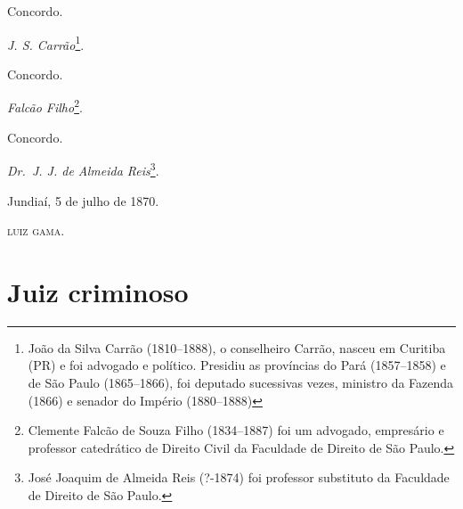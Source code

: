 Concordo.

\emph{J. S. Carrão}\footnote{ João da Silva Carrão (1810--1888), o
  conselheiro Carrão, nasceu em Curitiba (PR) e foi advogado e político.
  Presidiu as províncias do Pará (1857--1858) e de São Paulo (1865--1866),
  foi deputado sucessivas vezes, ministro da Fazenda (1866) e senador do
  Império (1880--1888)}.

Concordo.

\emph{Falcão Filho}\footnote{ Clemente Falcão de Souza Filho
  (1834--1887) foi um advogado, empresário e professor catedrático de
  Direito Civil da Faculdade de Direito de São Paulo.}.

Concordo.

\emph{Dr.~J. J. de Almeida Reis}\footnote{ José Joaquim de Almeida Reis
  (?-1874) foi professor substituto da Faculdade de Direito de São
  Paulo.}.
\begin{flushright}
Jundiaí, 5 de julho de 1870.

\textsc{luiz gama}.
\end{flushright}
\part{Juiz criminoso}

